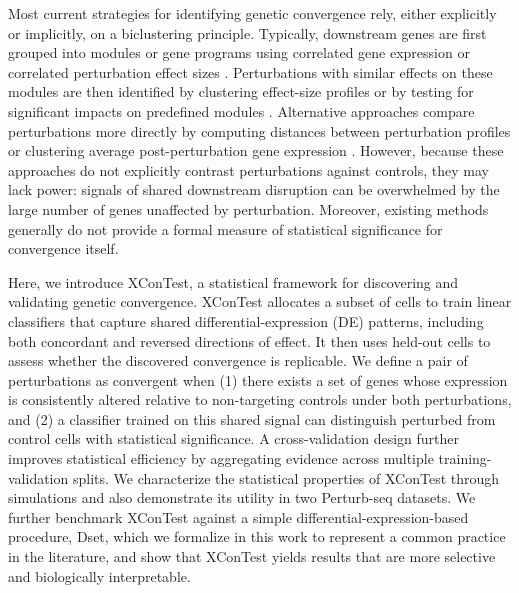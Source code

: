 \documentclass[11pt]{article}
\begin{document}
Most current strategies for identifying genetic convergence rely, either explicitly or implicitly, on a biclustering principle. Typically, downstream genes are first grouped into modules or gene programs using correlated gene expression \citep{schnitzler2024convergence} or correlated perturbation effect sizes \citep{Regev:2023,zhou2023new}. Perturbations with similar effects on these modules are then identified by clustering effect-size profiles \citep{duan2019model,Regev:2023} or by testing for significant impacts on predefined modules \citep{schnitzler2024convergence,yang2025perturbdb}. Alternative approaches compare perturbations more directly by computing distances between perturbation profiles or clustering average post-perturbation gene expression \citep{peidli2024scperturb,celik2024building}. However, because these approaches do not explicitly contrast perturbations against controls, they may lack power: signals of shared downstream disruption can be overwhelmed by the large number of genes unaffected by perturbation. Moreover, existing methods generally do not provide a formal measure of statistical significance for convergence itself.

Here, we introduce XConTest, a statistical framework for discovering and validating genetic convergence. XConTest allocates a subset of cells to train linear classifiers that capture shared differential-expression (DE) patterns, including both concordant and reversed directions of effect. It then uses held-out cells to assess whether the discovered convergence is replicable. We define a pair of perturbations as convergent when (1) there exists a set of genes whose expression is consistently altered relative to non-targeting controls under both perturbations, and (2) a classifier trained on this shared signal can distinguish perturbed from control cells with statistical significance. A cross-validation design further improves statistical efficiency by aggregating evidence across multiple training-validation splits. We characterize the statistical properties of XConTest through simulations and also demonstrate its utility in two Perturb-seq datasets. We further benchmark XConTest against a simple differential-expression-based procedure, Dset, which we formalize in this work to represent a common practice in the literature, and show that XConTest yields results that are more selective and biologically interpretable.
\end{document}
